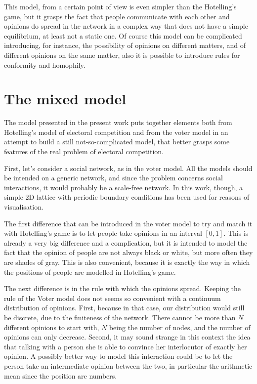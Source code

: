 \documentclass[11pt,a4paper,twocolumn]{article}
\begin{document}
This model, from a certain point of view is even simpler than the Hotelling's game, but it grasps the fact that people communicate with each other and opinions do spread in the network in a complex way that does not have a simple equilibrium, at least not a static one.
Of course this model can be complicated introducing, for instance, the possibility of opinions on different matters, and of different opinions on the same matter, also it is possible to introduce rules for conformity and homophily.

\section*{The mixed model}
\vspace*{-0.2cm}
The model presented in the present work puts together elements both from Hotelling's model of electoral competition and from the voter model in an attempt to build a still not-so-complicated model, that better grasps some features of the real problem of electoral competition.

First, let's consider a social network, as in the voter model. All the models should be intended on a generic network, and since the problem concerns social interactions, it would probably be a scale-free network. In this work, though, a simple 2D lattice with periodic boundary conditions has been used for reasons of visualisation. 

The first difference that can be introduced in the voter model to try and match it with Hotelling's game is to let people take opinions in an interval $[0,1]$. This is already a very big difference and a complication, but it is intended to model the fact that the opinion of people are not always black or white, but more often they are shades of gray. This is also convenient, because it is exactly the way in which the positions of people are modelled in Hotelling's game.

The next difference is in the rule with which the opinions spread. Keeping the rule of the Voter model does not seems so convenient with a continuum distribution of opinions. First, because in that case, our distribution would still be discrete, due to the finiteness of the network. There cannot be more than $N$ different opinions to start with, $N$ being the number of nodes, and the number of opinions can only decrease. Second, it may sound strange in this context the idea that talking with a person she is able to convince her interlocutor of exactly her opinion. A possibly better way to model this interaction could be to let the person take an intermediate opinion between the two, in particular the arithmetic mean since the position are numbers.
\end{document}
